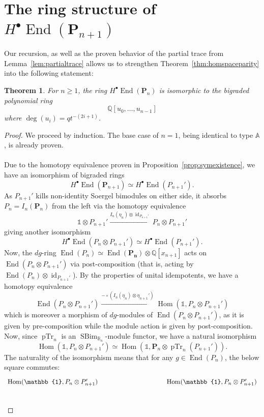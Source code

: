 \documentclass[11pt]{article}
\DeclareMathOperator{\Hom}{Hom}
\DeclareMathOperator{\End}{End}
\DeclareMathOperator{\id}{id}
\DeclareMathOperator{\SBim}{SBim}
\DeclareMathOperator{\pTr}{pTr}
\newtheorem{thm}{Theorem}[section]
\theoremstyle{definition}
\theoremstyle{remark}
\numberwithin{equation}{section}
\begin{document}
\section{The ring structure of
$H^\bullet \End(\mathbf{P}_{n+1})$}
Our recursion, as well as the proven behavior of the partial trace from
Lemma~\ref{lem:partialtrace} allows us to strengthen
Theorem~\ref{thm:homspaceparity} into the following statement:
\begin{thm}
	\label{thm:ringstructure}
	For $n\geq 1$,
	the ring $H^\bullet\End(\mathbf{P}_{n})$ is isomorphic to
	the bigraded polynomial ring
	\[\mathbb{Q}[u_0,\dots, u_{n-1}]\]
	where $\deg(u_i)=qt^{-(2i+1)}$.
\end{thm}
\begin{proof}
	We proceed by induction. The base case of $n=1$, being identical
	to type $\mathbb{A}$, is already proven.
	\\ \\
	Due to the homotopy equivalence proven in
	Proposition~\ref{prop:symexistence}, we have an isomorphism of
	bigraded rings
	\[H^\bullet\End(\mathbf{P}_{n+1})
	\simeq H^\bullet\End(P_{n+1}').\]
	As $P_{n+1}'$ kills non-identity Soergel bimodules on either side, 
	it absorbs $P_n=I_n(\mathbf{P}_n)$ from the left via the homotopy equivalence
	\[\mathbb{1}\otimes P_{n+1}'\xrightarrow{I_n(\eta_n)\otimes
	\id_{P_{n+1}'}} P_n \otimes P_{n+1}'\]
	giving another isomorphism
	\[H^\bullet \End( P_n\otimes P_{n+1}') \simeq
	H^\bullet\End(P_{n+1}').\]
	Now, the $dg$-ring
	$\End(P_{n}) \simeq \End(\mathbf{P_n})\otimes \mathbb{Q}[x_{n+1}]$
	acts on $\End( P_n\otimes P_{n+1}')$ via post-composition
	(that is, acting by
	$\End(P_n)\otimes \id_{P_{n+1}'}$). By the
	properties of unital idempotents, we have a homotopy equivalence
	\[\End(P_n\otimes P_{n+1}')\xrightarrow{-\circ
	(I_n(\eta_n)\otimes \eta_{n+1}')} \Hom(\mathbb{1},P_n
	\otimes  P_{n+1}')\]
	which is moreover a morphism of $dg$-modules
	of $\End(P_n \otimes P_{n+1}')$, as it is given by pre-composition
	while the module action is given by post-composition. Now, since
	$\pTr_n$ is an
	$\SBim_{\mathbb{B}_n}$-module functor, we have a natural isomorphism
	\[\Hom(\mathbb{1}, P_n\otimes P_{n+1}')\simeq
	\Hom(\mathbb{1}, \mathbf{P}_n\otimes \pTr_n(P_{n+1}')).\]
	The naturality of the isomorphism means that for any
	$g\in \End(P_n)$, the below square commutes:
\[\begin{tikzcd}[ampersand replacement=\&,column sep=huge]
	{\Hom(\mathbb{1},P_n\otimes P_{n+1}')} \& \& 
{\Hom(\mathbb{1},P_n \otimes P_{n+1}')} \\

\end{tikzcd}\]
\end{proof}
\end{document}
